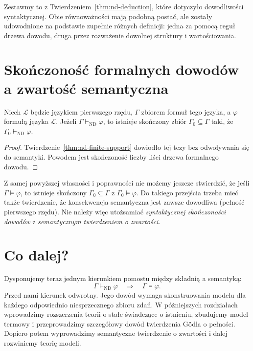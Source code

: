 Zestawmy to z Twierdzeniem~\ref{thm:nd-deduction},
które dotyczyło dowodliwości syntaktycznej. Obie równoważności
mają podobną postać, ale zostały udowodnione na podstawie
zupełnie różnych definicji: jedna za pomocą reguł drzewa dowodu,
druga przez rozważenie dowolnej struktury i wartościowania.

\section{Skończoność formalnych dowodów a zwartość semantyczna}
\begin{twierdzenie}
\label{thm:soundness-syntactic-finitary}
Niech $\mathcal L$ będzie językiem pierwszego rzędu,
$\Gamma$ zbiorem formuł tego języka, a $\varphi$
formułą języka $\mathcal L$.
Jeżeli $\Gamma\vdash_{\mathrm{ND}}\varphi$, to istnieje
skończony zbiór $\Gamma_0\subseteq\Gamma$ taki, że
$\Gamma_0\vdash_{\mathrm{ND}}\varphi$.
\end{twierdzenie}
\begin{proof}
Twierdzenie~\ref{thm:nd-finite-support} dowiodło tej tezy
bez odwoływania się do semantyki. Powodem jest skończoność
liczby liści drzewa formalnego dowodu.
\end{proof}

\begin{uwaga}
Z samej powyższej własności i poprawności nie możemy jeszcze
stwierdzić, że jeśli $\Gamma\models\varphi$, to istnieje
skończony $\Gamma_0\subseteq\Gamma$ z
$\Gamma_0\models\varphi$.
Do takiego przejścia trzeba mieć także twierdzenie,
że konsekwencja semantyczna jest zawsze dowodliwa
(pełność pierwszego rzędu).
Nie należy więc utożsamiać \emph{syntaktycznej skończoności
dowodów} z \emph{semantycznym twierdzeniem o zwartości}.
\end{uwaga}

\section{Co dalej?}
Dysponujemy teraz jednym kierunkiem pomostu między składnią
a semantyką:
\[
\Gamma\vdash_{\mathrm{ND}}\varphi
\quad\Longrightarrow\quad
\Gamma\models\varphi.
\]
Przed nami kierunek odwrotny. Jego dowód wymaga skonstruowania
modelu dla każdego odpowiednio niesprzecznego zbioru zdań.
W późniejszych rozdziałach wprowadzimy rozszerzenia teorii
o stałe świadczące o istnieniu, zbudujemy model termowy
i przeprowadzimy szczegółowy dowód twierdzenia Gödla o pełności.
Dopiero potem wyprowadzimy semantyczne twierdzenie o zwartości
i dalej rozwiniemy teorię modeli.